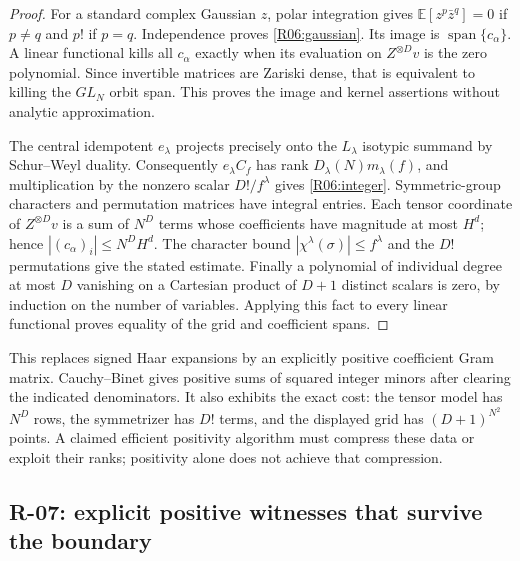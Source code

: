 \begin{proof}
For a standard complex Gaussian $z$, polar integration gives
$\mathbb E[z^p\bar z^q]=0$ if $p\ne q$ and $p!$ if $p=q$.
Independence proves \eqref{R06:gaussian}. Its image is
$\operatorname{span}\{c_\alpha\}$. A linear functional kills all
$c_\alpha$ exactly when its evaluation on $Z^{\otimes D}v$ is the zero
polynomial. Since invertible matrices are Zariski dense, that is
equivalent to killing the $GL_N$ orbit span. This proves the image and
kernel assertions without analytic approximation.

The central idempotent $e_\lambda$ projects precisely onto the
$L_\lambda$ isotypic summand by Schur--Weyl duality. Consequently
$e_\lambda C_f$ has rank $D_\lambda(N)m_\lambda(f)$, and multiplication
by the nonzero scalar $D!/f^\lambda$ gives \eqref{R06:integer}.
Symmetric-group characters and permutation matrices have integral
entries. Each tensor coordinate of $Z^{\otimes D}v$ is a sum of $N^D$
terms whose coefficients have magnitude at most $H^d$; hence
$|(c_\alpha)_i|\leq N^D H^d$. The character bound
$|\chi^\lambda(\sigma)|\leq f^\lambda$ and the $D!$ permutations give
the stated estimate. Finally a polynomial of individual degree at
most $D$ vanishing on a Cartesian product of $D+1$ distinct scalars is
zero, by induction on the number of variables. Applying this fact to
every linear functional proves equality of the grid and coefficient
spans.
\end{proof}

This replaces signed Haar expansions by an explicitly positive
coefficient Gram matrix. Cauchy--Binet gives positive sums of squared
integer minors after clearing the indicated denominators. It also
exhibits the exact cost: the tensor model has $N^D$ rows, the
symmetrizer has $D!$ terms, and the displayed grid has
$(D+1)^{N^2}$ points. A claimed efficient positivity algorithm must
compress these data or exploit their ranks; positivity alone does
not achieve that compression.

\subsection{R-07: explicit positive witnesses that survive the boundary}

